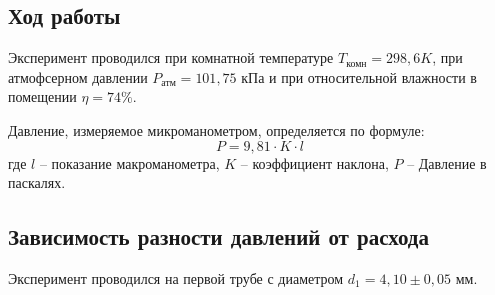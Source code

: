 \documentclass[a4paper, 12pt]{article}
\begin{document}
\begin{center}
    
    \section*{Ход работы}

    Эксперимент проводился при комнатной температуре $T_\text{комн}=298,6 K$, при атмофсерном давлении $P_\text{атм}=101,75$ кПа и при относительной влажности в помещении $\eta=74\%$.

Давление, измеряемое микроманометром, определяется по формуле:
\[
P=9,81 \cdot K \cdot l 
\]
где $l$ -- показание макроманометра, $K$ -- коэффициент наклона, $P$ -- Давление в паскалях.

\subsection*{Зависимость разности давлений от расхода}

Эксперимент проводился на первой трубе с диаметром $d_1=4,10\pm0,05$ мм.
    
    
    \begin{table}[h]
        \centering
        \begin{tabular}{|c|c|c|c|c|}
    

\end{tabular}
\end{table}
\end{center}
\end{document}
